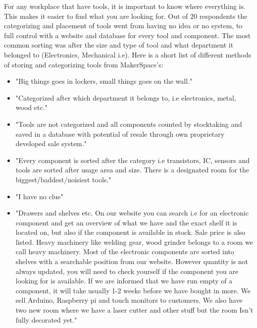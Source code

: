 For any workplace that have tools, it is important to know where everything is. This makes it easier to find what you are looking for. Out of 20 respondents the categorizing and placement of tools went from having no idea or no system, to full control with a website and database for every tool and component. The most common sorting was after the size and type of tool and what department it belonged to (Electronics, Mechanical i.e). Here is a short list of different methods of storing and categorizing tools from MakerSpace's:

\begin{itemize}
    \item "Big things goes in lockers, small things goes on the wall."
    \item "Categorized after which department it belongs to, i.e electronics, metal, wood etc."
    \item "Tools are not categorized and all components counted by stocktaking and saved in a database with potential of resale through own proprietary developed sale system."  
    \item "Every component is sorted after the category i.e transistors, IC, sensors and tools are sorted after usage area and size. There is a designated room for the biggest/baddest/noisiest tools." 
    \item "I have no clue"
    \item "Drawers and shelves etc. On our website you can search i.e for an electronic component and get an overview of what we have and the exact shelf it is located on, but also if the component is available in stock. Sale price is also listed. Heavy machinery like welding gear, wood grinder belongs to a room we call heavy machinery.
    Most of the electronic components are sorted into shelves with a searchable position from our website. However quantity is not always updated, you will need to check yourself if the component you are looking for is available. If we are informed that we have run empty of a component, it will take usually 1-2 weeks before we have bought in more. We sell Arduino, Raspberry pi and touch monitors to customers. We also have two new room where we have a laser cutter and other stuff but the room Isn't fully decorated yet."  
\end{itemize}

